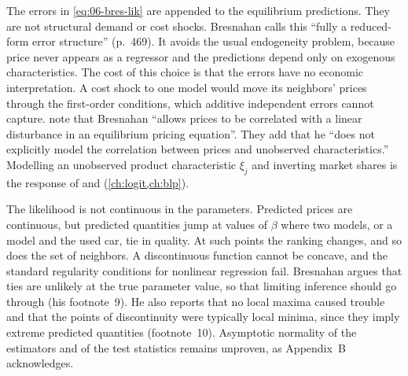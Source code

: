 \begin{remark}\label{rem:06-bres-reducedform}
The errors in \eqref{eq:06-bres-lik} are appended to the equilibrium predictions. They are not structural demand or
cost shocks. Bresnahan calls this ``fully a reduced-form error structure'' (p.~469). It avoids the usual
endogeneity problem, because price never appears as a regressor and the predictions depend only on exogenous
characteristics. The cost of this choice is that the errors have no economic interpretation. A cost shock to one model would move
its neighbors' prices through the first-order conditions, which additive independent errors cannot capture.
\citet[p.~843]{BerryLevinsohnPakes1995} note that Bresnahan ``allows prices to be correlated with a linear
disturbance in an equilibrium pricing equation''. They add that he ``does not explicitly model the correlation
between prices and unobserved characteristics.'' Modelling an unobserved product characteristic $\xi_j$ and inverting market shares is
the response of \citet{Berry1994} and \citet{BerryLevinsohnPakes1995} (\cref{ch:logit,ch:blp}).
\end{remark}

The likelihood is not continuous in the parameters. Predicted prices are continuous, but predicted quantities jump
at values of $\beta$ where two models, or a model and the used car, tie in quality. At such points the ranking
changes, and so does the set of neighbors. A discontinuous function cannot be concave, and the standard regularity
conditions for nonlinear regression fail. Bresnahan argues that ties are unlikely at the true parameter value, so
that limiting inference should go through (his footnote~9). He also reports that no local maxima caused trouble and
that the points of discontinuity were typically local minima, since they imply extreme predicted quantities
(footnote~10). Asymptotic normality of the estimators and of the test statistics remains unproven, as Appendix~B
acknowledges.

